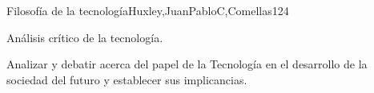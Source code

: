 \begin{syllabus}
\begin{unit}{Filosofía de la tecnología}{Huxley,JuanPabloC,Comellas}{12}{4}
\begin{topics}
      \item {Análisis crítico de la tecnología.}
\end{topics}
\begin{learningoutcomes}
	\item Analizar  y debatir acerca del papel de la Tecnología en el desarrollo de la sociedad del futuro y establecer  sus implicancias. 
\end{learningoutcomes}
\end{unit}



\begin{coursebibliography}
\end{coursebibliography}

\end{syllabus}

%
